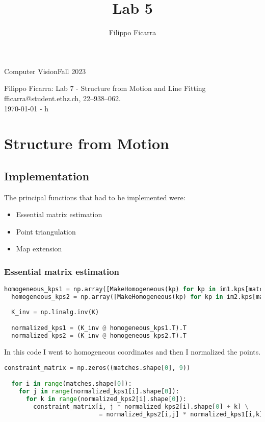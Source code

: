 \documentclass{ETHExercise}
\title{Lab 5}
\author{Filippo Ficarra}
\newcommand{\timestamp}{\ddmmyyyydate\today \,\,- \currenttime h}
\begin{document}
{}
{\Large Computer Vision}{Fall 2023}
\begin{center}
    {\Huge Filippo Ficarra: Lab 7 - Structure from Motion and Line Fitting}\\
      \quad\newline
      fficarra@student.ethz.ch, 22--938--062.\\
      \quad\newline
      \timestamp
      \end{center}



\section{Structure from Motion}
\subsection{Implementation}
The principal functions that had to be implemented were:
\begin{itemize}
  \item Essential matrix estimation
  \item Point triangulation
  \item Map extension
\end{itemize}

\subsubsection{Essential matrix estimation}

\begin{lstlisting}[language=Python, caption=homogeneous coordinate and normalizing]
  homogeneous_kps1 = np.array([MakeHomogeneous(kp) for kp in im1.kps[matches[:,0]]])
  homogeneous_kps2 = np.array([MakeHomogeneous(kp) for kp in im2.kps[matches[:,1]]])
  
  K_inv = np.linalg.inv(K)

  normalized_kps1 = (K_inv @ homogeneous_kps1.T).T
  normalized_kps2 = (K_inv @ homogeneous_kps2.T).T

\end{lstlisting}

In this code I went to homogeneous coordinates and then I normalized the points.

\begin{lstlisting}[language=Python, caption=constraint matrix]
  constraint_matrix = np.zeros((matches.shape[0], 9))

  for i in range(matches.shape[0]):
    for j in range(normalized_kps1[i].shape[0]):
      for k in range(normalized_kps2[i].shape[0]):
        constraint_matrix[i, j * normalized_kps2[i].shape[0] + k] \
                          = normalized_kps2[i,j] * normalized_kps1[i,k]

\end{lstlisting}
\end{document}
